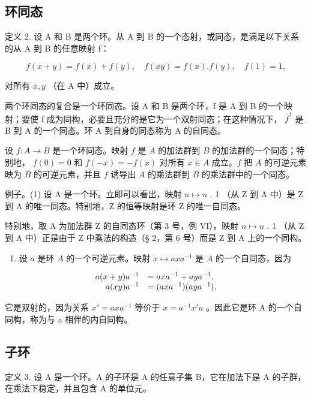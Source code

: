 \subsection{环同态}

定义 2. 设 A 和 B 是两个环。从 A 到 B 的一个态射，或同态，是满足以下关系的从 A 到 B 的任意映射 f：

\[
f (x + y) = f (x) + f (y), \quad f (x y) = f (x). f (y), \quad f (1) = 1,\tag{17}
\]

对所有 \(x, y\) （在 A 中）成立。

两个环同态的复合是一个环同态。设 A 和 B 是两个环，f 是 A 到 B 的一个映射；要使 f 成为同构，必要且充分的是它为一个双射同态；在这种情况下， \(\overline{f}^{1}\) 是 B 到 A 的一个同态。环 A 到自身的同态称为 A 的自同态。

设 \(f: A \to B\) 是一个环同态。映射 \(f\) 是 \(A\) 的加法群到 \(B\) 的加法群的一个同态；特别地， \(f(0) = 0\) 和 \(f(-x) = -f(x)\) 对所有 \(x \in A\) 成立。\(f\) 把 \(A\) 的可逆元素映为 \(B\) 的可逆元素，并且 \(f\) 诱导出 \(A\) 的乘法群到 \(B\) 的乘法群中的一个同态。

例子。(1) 设 A 是一个环。立即可以看出，映射 \(n \mapsto n\) . 1 （从 Z 到 A 中）是 Z 到 A 的唯一同态。特别地，Z 的恒等映射是环 Z 的唯一自同态。

特别地，取 A 为加法群 Z 的自同态环（第 3 号，例 VI）。映射 \(n \mapsto n\) . 1 （从 Z 到 A 中）正是由于 Z 中乘法的构造（§ 2，第 6 号）而是 Z 到 A 上的一个同构。

\begin{enumerate}
\def\labelenumi{(\arabic{enumi})}
\setcounter{enumi}{1}
\tightlist
\item
  设 \(a\) 是环 \(A\) 的一个可逆元素。映射 \(x \mapsto axa^{-1}\) 是 \(A\) 的一个自同态，因为
\end{enumerate}

\[
\begin{array}{r l} a (x + y) a ^ {- 1} & = a x a ^ {- 1} + a y a ^ {- 1}, \\ a (x y) a ^ {- 1} & = (a x a ^ {- 1}) (a y a ^ {- 1}). \end{array}
\]

它是双射的，因为关系 \(x' = axa^{-1}\) 等价于 \(x = a^{-1}x'a\) 。因此它是环 A 的一个自同构，称为与 a 相伴的内自同构。

\subsection{子环}

定义 3. 设 A 是一个环。A 的子环是 A 的任意子集 B，它在加法下是 A 的子群，在乘法下稳定，并且包含 A 的单位元。

